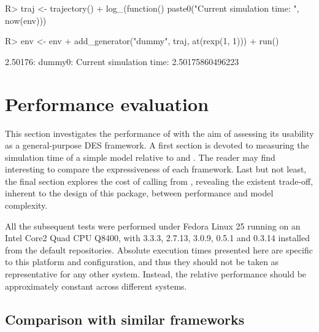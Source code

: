 \documentclass[
  nojss]{jss}
\begin{document}
\begin{CodeChunk}
\begin{CodeInput}
R> traj <- trajectory() %
+   log_(function() paste0("Current simulation time: ", now(env)))
\end{CodeInput}
\end{CodeChunk}

\begin{CodeChunk}
\begin{CodeInput}
R> env <- env %
+   add_generator("dummy", traj, at(rexp(1, 1))) %
+   run()
\end{CodeInput}
\begin{CodeOutput}
2.50176: dummy0: Current simulation time: 2.50175860496223
\end{CodeOutput}
\end{CodeChunk}

\section{Performance evaluation}\label{performance-evaluation}

This section investigates the performance of  with the aim
of assessing its usability as a general-purpose DES framework. A first
section is devoted to measuring the simulation time of a simple model
relative to  and . The reader may find
interesting to compare the expressiveness of each framework. Last but
not least, the final section explores the cost of calling 
from , revealing the existent trade-off, inherent to the
design of this package, between performance and model complexity.

All the subsequent tests were performed under Fedora Linux 25 running on
an Intel Core2 Quad CPU Q8400, with  3.3.3,
 2.7.13,  3.0.9,  0.5.1 and
 0.3.14 installed from the default repositories. Absolute
execution times presented here are specific to this platform and
configuration, and thus they should not be taken as representative for
any other system. Instead, the relative performance should be
approximately constant across different systems.

\subsection{Comparison with similar
frameworks}\label{comparison-with-similar-frameworks}
\end{document}
